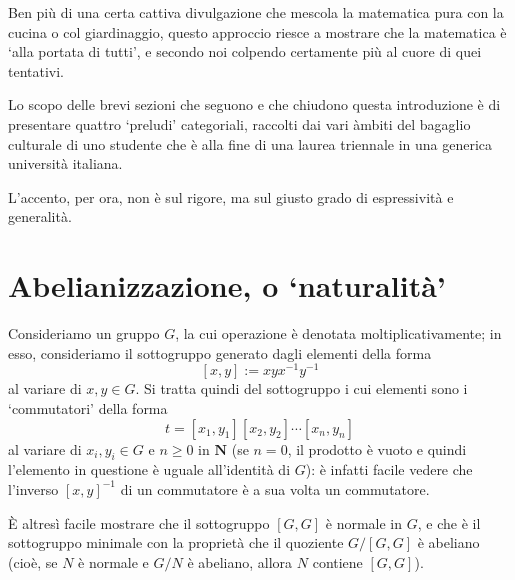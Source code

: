 Ben più di una certa cattiva divulgazione che mescola la matematica pura con la cucina o col giardinaggio, questo approccio riesce a mostrare che la matematica è `alla portata di tutti', e secondo noi colpendo certamente più al cuore di quei tentativi.

\medskip
Lo scopo delle brevi sezioni che seguono e che chiudono questa introduzione è di presentare quattro `preludi' categoriali, raccolti dai vari àmbiti del bagaglio culturale di uno studente che è alla fine di una laurea triennale in una generica università italiana.

L'accento, per ora, non è sul rigore, ma sul giusto grado di espressività e generalità.
\section*{Abelianizzazione, o `naturalità'}
Consideriamo un gruppo \(G\), la cui operazione è denotata moltiplicativamente; in esso, consideriamo il sottogruppo generato dagli elementi della forma
\[[x,y]:= xyx^{-1}y^{-1}\]
al variare di \(x,y\in G\). Si tratta quindi del sottogruppo i cui elementi sono i `commutatori' della forma
\[t = [x_1,y_1][x_2,y_2]\cdots[x_n,y_n]\]
al variare di \(x_i,y_i\in G\) e \(n\ge 0\) in \(\mathbf{N}\) (se \(n=0\), il prodotto è vuoto e quindi l'elemento in questione è uguale all'identità di \(G\)): è infatti facile vedere che l'inverso \([x,y]^{-1}\) di un commutatore è a sua volta un commutatore.

\`E altresì facile mostrare che il sottogruppo \([G,G]\) è normale in \(G\), e che è il sottogruppo minimale con la proprietà che il quoziente \(G/[G,G]\) è abeliano (cioè, se \(N\) è normale e \(G/N\) è abeliano, allora \(N\) contiene \([G,G]\)).

